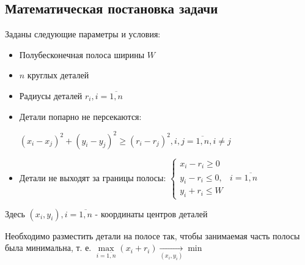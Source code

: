 \subsection{Математическая постановка задачи}
Заданы следующие параметры и условия:
\begin{itemize}
\item Полубесконечная полоса ширины $W$ 
\item $n$ круглых деталей
\item Радиусы деталей  $r_{i}, i = \overline{1, n}$
\item Детали попарно не персекаются:

$(x_{i} - x_{j})^{2} + (y_{i} - y_{j})^{2} \ge (r_{i} - r_{j})^{2}, i, j = \overline{1, n}, i \neq j$
\item Детали не выходят за границы полосы: 
$%
\begin{cases}
	x_{i} - r_{i} \ge 0 \\
	y_{i} - r_{i} \le 0,	& i = \overline{1, n} \\
	y_{i} + r_{i} \le W
\end{cases}
$%
\end{itemize}

Здесь ${(x_{i}, y_{i}),   i = \overline{1, n}}$ - координаты центров деталей

Необходимо разместить детали на полосе так, чтобы занимаемая часть полосы была минимальна, т. е. ${\max\limits_{i = \overline{1, n}}(x_{i} + r_{i})\xrightarrow[{(x_i, y_i)}]{} \min}$
\printbibliography

